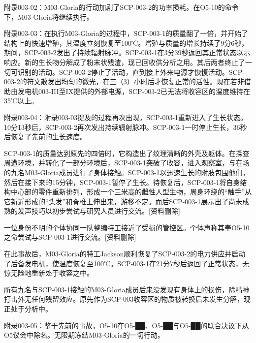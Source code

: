 附录003-02：M03-Gloria的行动加剧了SCP-003-2的功率损耗。在O5-10的命令下，M03-Gloria将继续执行。

附录003-03：在执行M03-Gloria的过程中，SCP-003-1的质量翻了一倍，并开始了结构上的快速增殖，其温度立刻恢复至100℃。增殖与质量的增长持续了9分6秒，期间，SCP-003-2发出了持续辐射脉冲。SCP-003-1在3分39秒返回其正常状态以示响应。新的生长物分解成了粉末状残渣，现已回收供分析之用。其后两者终止了一切可识别的活动。SCP-003-2停止了活动，直到接上外来电源才恢愎活动。SCP-003-2的符文散发出均匀的微光，在三（3）小时后才恢复正常的活性。现在若非借助由发电机003-III至IX提供的外部电源，SCP-003-2已无法将收容区的温度维持在35℃以上。

附录003-04：附录003-03提及的过程再次出现，SCP-003-1重新进入了生长状态。10分13秒后，SCP-003-2再次发出持续辐射脉冲。SCP-003-1一时停止生长，36秒后恢复了先前的生长速度。

SCP-003-1的质量达到原先的四倍时，它构造出了纹理清晰的外壳及躯体。在探查周遭环境，并转化了一部分环境后，SCP-003-1突破了收容，进入观察室，与在场的九名M03-Gloria成员进行了身体接触。SCP-003-1以迅速生长的附肢包围他们，然后在接下来的15分钟，SCP-003-1暂停了生长。待恢复后，SCP-003-1将自身结构中心部的零件重新排列，形成一个三米高的雌性人型生物，周身环绕的“触手”从它新近形成的“头发”和脊椎上伸出来，游移不定。而后SCP-003-1展示出了尚未成熟的发声技巧以初步尝试与研究人员进行交流。[资料删除]

一位身份不明的个体协同一队整编特工接近了受损的管控区。个体声称其奉O5-10之命尝试与SCP-003-1进行交流。[资料删除]

在此事故后，M03-Gloria的特工Jackson顺利恢复了SCP-003-2的电力供应并启动了后备发电机，使温度恢复至100℃。SCP-003-1在21分7秒后返回了正常状态，无惊无险地重新处于收容之中。

所有九名与SCP-003-1接触的M03-Gloria成员后来没发现有身体上的损伤，除精神打击外无任何残留效应。原先作为SCP-003收容区的物质被转换后未发生分解，现正处于分析中。

附录003-05：鉴于先前的事故，O5-10在O5-██、O5-██与O5-██的联合决议下从O5议会中除名。无限期冻结M03-Gloria的一切行动。

\hr



